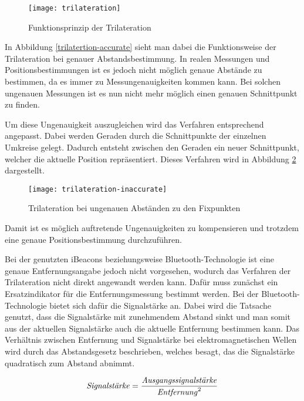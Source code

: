 \begin{figure}[htb!]
	\centering
	\texttt{[image: trilateration]}
	\caption{Funktionsprinzip der Trilateration}
	\label{trilateration-accurate}
\end{figure}

In Abbildung \ref{trilatertion-accurate} sieht man dabei die Funktionsweise der Trilateration bei genauer Abstandsbestimmung. In realen Messungen und Positionsbestimmungen ist es jedoch nicht möglich genaue Abstände zu bestimmen, da es immer zu Messungenauigkeiten kommen kann.
Bei solchen ungenauen Messungen ist es nun nicht mehr möglich einen genauen Schnittpunkt zu finden. 

Um diese Ungenauigkeit auszugleichen wird das Verfahren entsprechend angepasst. Dabei werden Geraden durch die Schnittpunkte der einzelnen Umkreise gelegt. Dadurch entsteht zwischen den Geraden ein neuer Schnittpunkt, welcher die aktuelle Position repräsentiert. Dieses Verfahren wird in Abbildung \ref{trilateration-inaccurate} dargestellt.

\begin{figure}[htb!]
		\centering
	\texttt{[image: trilateration-inaccurate]}
	\caption{Trilateration bei ungenauen Abständen zu den Fixpunkten}
	\label{trilateration-inaccurate}
\end{figure}

Damit ist es möglich auftretende Ungenauigkeiten zu kompensieren und trotzdem eine genaue Positionsbestimmung durchzuführen.

Bei der genutzten iBeacons beziehungsweise Bluetooth-Technologie ist eine genaue Entfernungsangabe jedoch nicht vorgesehen, wodurch das Verfahren der Trilateration nicht direkt angewandt werden kann. Dafür muss zunächst ein Ersatzindikator für die Entfernungsmessung bestimmt werden.
Bei der Bluetooth-Technologie bietet sich dafür die Signalstärke an.
Dabei wird die Tatsache genutzt, dass die Signalstärke mit zunehmendem Abstand sinkt und man somit aus der aktuellen Signalstärke auch die aktuelle Entfernung bestimmen kann. 
Das Verhältnis zwischen Entfernung und Signalstärke bei elektromagnetischen Wellen wird durch das Abstandsgesetz beschrieben, welches besagt, das die Signalstärke quadratisch zum Abstand abnimmt.

\begin{equation}
	\text{\emph{Signalstärke}} = \frac{\text{\emph{Ausgangssignalstärke}}}{\text{\emph{Entfernung}}^2}
\end{equation}

